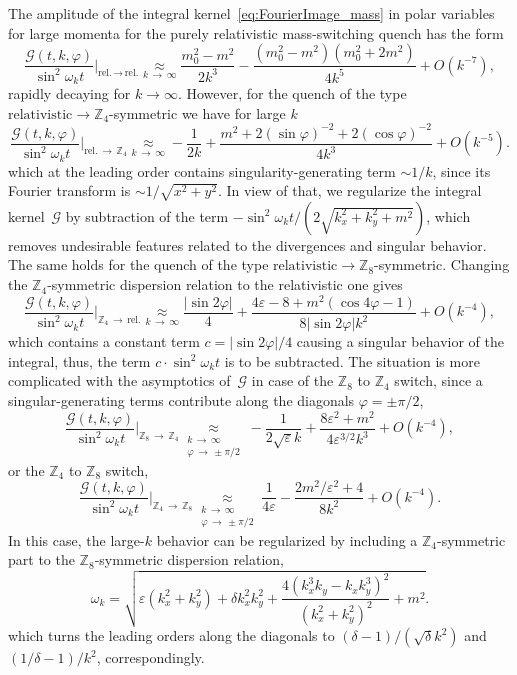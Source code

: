 \documentclass[a4paper,12pt]{article}
\newcommand{\be}{\begin{equation}}
\newcommand{\ee}{\end{equation}}
\newcommand{\eps}{\varepsilon}
\newcommand{\om}{\omega}
\newcommand{\largemom}{\underset{k\,\to\,\infty}{\approx}}
\newcommand{\Z}[1]{\mathbb{Z}_{#1}}
\begin{document}
The amplitude of the integral kernel~\eqref{eq:FourierImage_mass} in polar variables for large momenta for the purely relativistic mass-switching quench has the form
\be
    \frac{\mathcal{G}(t, k, \varphi)}{\sin^2\om_k t}\Big|_{\text{rel.}\,\to\,\text{rel.}} \largemom \frac{m_0^2 - m^2}{2k^3} - \frac{(m_0^2 - m^2)(m_0^2 + 2m^2)}{4 k^5} + O\left(k^{-7}\right),
\ee
rapidly decaying for $k \to \infty$. However, for the quench of the type $\text{relativistic} \to \Z4$-symmetric we have for large $k$
\be
    \frac{\mathcal{G}(t, k, \varphi)}{\sin^2\om_k t}\Big|_{\text{rel.}\,\to\,\Z4} \largemom -\frac{1}{2k} + \frac{m^2 + 2(\sin\varphi)^{-2} + 2(\cos\varphi)^{-2}}{4 k^3} + O\left(k^{-5}\right).
\ee
which at the leading order contains singularity-generating term $\sim 1/k$, since its Fourier transform is $\sim 1/\sqrt{x^2 + y^2}$. In view of that, we regularize the integral kernel~$\mathcal{G}$ by subtraction of the term $-\sin^2\omega_k t/(2\sqrt{k_x^2 + k_y^2 + m^2})$, which removes undesirable features related to the divergences and singular behavior. The same holds for the quench of the type $\text{relativistic} \to \Z8$-symmetric. Changing the $\Z4$-symmetric dispersion relation to the relativistic one gives
\be
    \frac{\mathcal{G}(t, k, \varphi)}{\sin^2\om_k t}\Big|_{\Z4\,\to\,\text{rel.}} \largemom \frac{|\sin 2\varphi|}{4} + \frac{4\eps - 8 + m^2(\cos 4\varphi - 1)}{8|\sin 2\varphi|k^2} + O\left(k^{-4}\right),
\ee
which contains a constant term $c = |\sin 2\varphi|/4$ causing a singular behavior of the integral, thus, the term $c \cdot \sin^2\omega_k t$ is to be subtracted. The situation is more complicated with the asymptotics of~$\mathcal{G}$ in case of the $\Z8$ to $\Z4$ switch, since a singular-generating terms contribute along the diagonals $\varphi = \pm\pi/2$,
\be
    \frac{\mathcal{G}(t, k, \varphi)}{\sin^2\om_k t}\Big|_{\Z8\,\to\,\Z4} \underset{\substack{k\,\to\,\infty \\ \varphi\,\to\,\pm\pi/2}}{\approx} -\frac{1}{2\sqrt{\eps}k} + \frac{8\eps^2 + m^2}{4 \eps^{3/2}k^3} + O\left(k^{-4}\right),
\ee
or the $\Z4$ to $\Z8$ switch,
\be
    \frac{\mathcal{G}(t, k, \varphi)}{\sin^2\om_k t}\Big|_{\Z4\,\to\,\Z8} \underset{\substack{k\,\to\,\infty \\ \varphi\,\to\,\pm\pi/2}}{\approx} \frac{1}{4\eps} - \frac{2m^2/\eps^2 + 4}{8k^2} + O\left(k^{-4}\right).
\ee
In this case, the large-$k$ behavior can be regularized by including a $\Z4$-symmetric part to the $\Z8$-symmetric dispersion relation,
\be
    \omega_k = \sqrt{\eps(k_x^2 + k_y^2) + \delta k_x^2 k_y^2 + \frac{4(k_x^3 k_y - k_x k_y^3)^2}{(k_x^2 + k_y^2)^2} + m^2}.
\ee
which turns the leading orders along the diagonals to $(\delta - 1)/(\sqrt{\delta}k^2)$ and $(1/\delta - 1)/k^2$, correspondingly.
\end{document}
